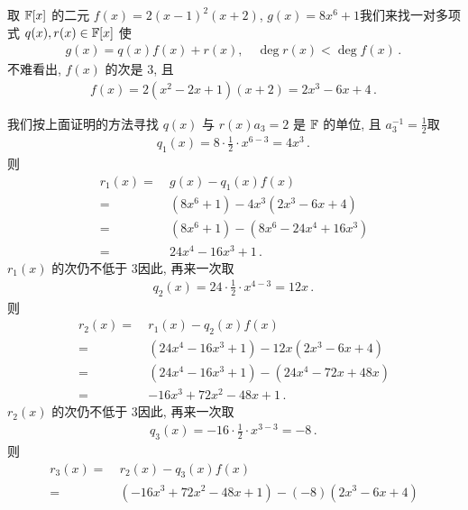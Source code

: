 \begin{example}
    取 $\mathbb{F}[x]$ 的二元 $f(x) = 2(x-1)^2 (x+2)$, $g(x) = 8x^6 + 1$\period 我们来找一对多项式 $q(x), r(x) \in \mathbb{F}[x]$ 使
    \begin{align*}
        g(x) = q(x) f(x) + r(x), \quad \deg r(x) < \deg f(x) \period
    \end{align*}
    不难看出, $f(x)$ 的次是 3, 且
    \begin{align*}
        f(x) = 2(x^2 - 2x + 1)(x+2) = 2x^3 - 6x + 4\period
    \end{align*}

    我们按上面证明的方法寻找 $q(x)$ 与 $r(x)$\period $a_3 = 2$ 是 $\mathbb{F}$ 的单位, 且 $a_3^{-1} = \frac12$\period 取
    \begin{align*}
        q_1 (x) = 8\cdot \frac12 \cdot x^{6-3} = 4x^3 \period
    \end{align*}
    则
    \begin{align*}
        r_1 (x)
        = \  & g(x) - q_1(x) f(x)                  \\
        = \  & (8x^6 + 1) - 4x^3 (2x^3 - 6x + 4)   \\
        = \  & (8x^6 + 1) - (8x^6 - 24x^4 + 16x^3) \\
        = \  & 24x^4 - 16x^3 + 1 \period
    \end{align*}
    $r_1 (x)$ 的次仍不低于 $3$\period 因此, 再来一次\period 取
    \begin{align*}
        q_2 (x) = 24 \cdot \frac12 \cdot x^{4-3} = 12x \period
    \end{align*}
    则
    \begin{align*}
        r_2 (x)
        = \  & r_1 (x) - q_2(x) f(x)                     \\
        = \  & (24x^4 - 16x^3 + 1) - 12x (2x^3 - 6x + 4) \\
        = \  & (24x^4 - 16x^3 + 1) - (24x^4 - 72x + 48x) \\
        = \  & -16x^3 + 72x^2 - 48x + 1 \period
    \end{align*}
    $r_2 (x)$ 的次仍不低于 $3$\period 因此, 再来一次\period 取
    \begin{align*}
        q_3 (x) = -16 \cdot \frac12 \cdot x^{3-3} = -8 \period
    \end{align*}
    则
    \begin{align*}
        r_3 (x)
        = \  & r_2 (x) - q_3(x) f(x)                             \\
        = \  & (-16x^3 + 72x^2 - 48x + 1) - (-8) (2x^3 - 6x + 4) \\

\end{align*}
\end{example}
